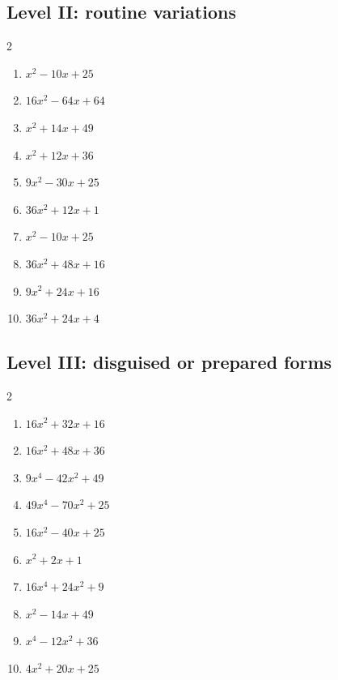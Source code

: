 \documentclass[11pt,oneside]{book}
\begin{document}
\subsection*{Level II: routine variations}
\begin{multicols}{2}
\begin{enumerate}[leftmargin=*,label=\textbf{\arabic*.},itemsep=0.65\baselineskip]
\item $ x^{2} - 10 x + 25 $
\item $ 16 x^{2} - 64 x + 64 $
\item $ x^{2} + 14 x + 49 $
\item $ x^{2} + 12 x + 36 $
\item $ 9 x^{2} - 30 x + 25 $
\item $ 36 x^{2} + 12 x + 1 $
\item $ x^{2} - 10 x + 25 $
\item $ 36 x^{2} + 48 x + 16 $
\item $ 9 x^{2} + 24 x + 16 $
\item $ 36 x^{2} + 24 x + 4 $
\end{enumerate}
\end{multicols}
\subsection*{Level III: disguised or prepared forms}
\begin{multicols}{2}
\begin{enumerate}[leftmargin=*,label=\textbf{\arabic*.},itemsep=0.65\baselineskip]
\item $ 16 x^{2} + 32 x + 16 $
\item $ 16 x^{2} + 48 x + 36 $
\item $ 9 x^{4} - 42 x^{2} + 49 $
\item $ 49 x^{4} - 70 x^{2} + 25 $
\item $ 16 x^{2} - 40 x + 25 $
\item $ x^{2} + 2 x + 1 $
\item $ 16 x^{4} + 24 x^{2} + 9 $
\item $ x^{2} - 14 x + 49 $
\item $ x^{4} - 12 x^{2} + 36 $
\item $ 4 x^{2} + 20 x + 25 $
\end{enumerate}
\end{multicols}
\end{document}

